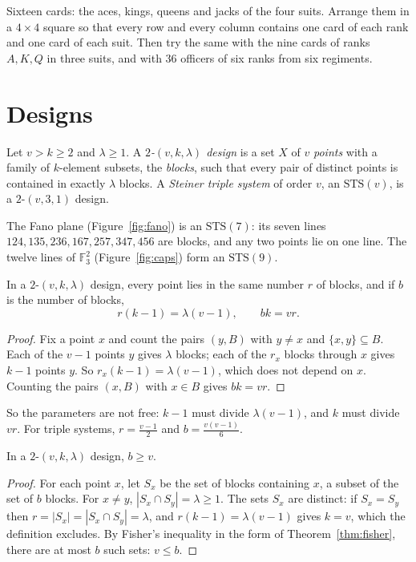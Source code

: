 \begin{think}
Sixteen cards: the aces, kings, queens and jacks of the four suits. Arrange them in a $4\times4$ square so that every row and every
column contains one card of each rank and one card of each suit. Then try the same with the nine cards of ranks $A,K,Q$ in three suits,
and with $36$ officers of six ranks from six regiments.
\end{think}

\section{Designs}

\begin{definition}\label{def:design}
Let $v>k\ge2$ and $\lambda\ge1$. A \emph{$2$-$(v,k,\lambda)$ design} is a set $X$ of $v$ \emph{points} with a family of $k$-element subsets, the \emph{blocks}, such
that every pair of distinct points is contained in exactly $\lambda$ blocks. A \emph{Steiner triple system} of order $v$, an $\mathrm{STS}(v)$, is a $2$-$(v,3,1)$ design.
\end{definition}

The Fano plane (Figure~\ref{fig:fano}) is an $\mathrm{STS}(7)$: its seven lines $124,135,236,167,257,347,456$ are blocks, and any two points lie on one line. The
twelve lines of $\mathbb F_3^2$ (Figure~\ref{fig:caps}) form an $\mathrm{STS}(9)$.

\begin{proposition}\label{prop:params}
In a $2$-$(v,k,\lambda)$ design, every point lies in the same number $r$ of blocks, and if $b$ is the number of blocks,
\[
r(k-1)=\lambda(v-1),\qquad bk=vr.
\]
\end{proposition}
\begin{proof}
Fix a point $x$ and count the pairs $(y,B)$ with $y\ne x$ and $\{x,y\}\subseteq B$. Each of the $v-1$ points $y$ gives $\lambda$ blocks; each of the $r_x$ blocks through $x$
gives $k-1$ points $y$. So $r_x(k-1)=\lambda(v-1)$, which does not depend on $x$. Counting the pairs $(x,B)$ with $x\in B$ gives $bk=vr$.
\end{proof}

So the parameters are not free: $k-1$ must divide $\lambda(v-1)$, and $k$ must divide $vr$. For triple systems, $r=\frac{v-1}2$ and $b=\frac{v(v-1)}6$.

\begin{theorem}[Fisher, 1940]\label{thm:fisherdesign}
In a $2$-$(v,k,\lambda)$ design, $b\ge v$.
\end{theorem}
\begin{proof}
For each point $x$, let $S_x$ be the set of blocks containing $x$, a subset of the set of $b$ blocks. For $x\ne y$, $|S_x\cap S_y|=\lambda\ge1$. The sets $S_x$ are distinct:
if $S_x=S_y$ then $r=|S_x|=|S_x\cap S_y|=\lambda$, and $r(k-1)=\lambda(v-1)$ gives $k=v$, which the definition excludes. By Fisher's inequality in the form of Theorem~\ref{thm:fisher},
there are at most $b$ such sets: $v\le b$.
\end{proof}

